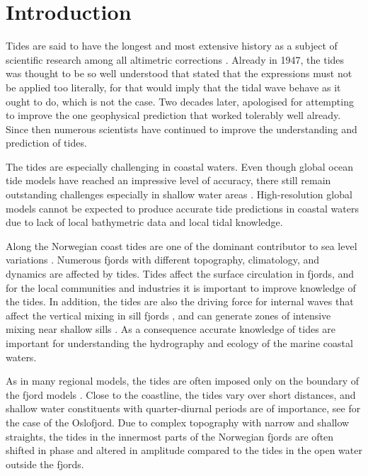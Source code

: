 \section{Introduction}

Tides are said to have the longest and most extensive history as a subject of scientific research among all altimetric corrections \cite[]{egbert94,cartwright77,hendershott81}. Already in 1947, the tides was thought to be so well understood that \cite{unna47} stated that the expressions must not be applied too literally, for that would imply that the tidal wave behave as it ought to do, which is not the case. Two decades later,  \cite{munk66} apologised for attempting to improve the one geophysical prediction that worked tolerably well already. Since then numerous scientists have continued to improve the understanding and prediction of tides. 

The tides are especially challenging in coastal waters. Even though global ocean tide models have reached an impressive level of accuracy, there still remain outstanding challenges especially in shallow water areas \cite[]{stammer14}. 
High-resolution global models cannot be expected to produce accurate tide predictions in coastal waters due to lack of local bathymetric data and local tidal knowledge. 

Along the Norwegian coast tides are one of the dominant contributor to sea level variations \cite[]{grabbe09}. Numerous fjords with different topography, climatology, and dynamics are affected by tides. Tides affect the surface circulation in fjords, and for the local communities and industries it is important to improve knowledge of the tides. In addition, the tides are also the driving force for internal waves that affect the vertical mixing in sill fjords \cite[]{stigebrandt76}, and can generate zones of intensive mixing near shallow sills \cite[]{staal15}. As a consequence accurate knowledge of tides are important for understanding the hydrography and ecology of the marine coastal waters.

As in many regional models, the tides are often imposed only on the boundary of the fjord models \cite[]{gjevik89,carniello05,lynge13}. Close to the coastline, the tides vary over short distances, and shallow water constituents with quarter-diurnal periods are of importance, see \cite{trygg74} for the case of the Oslofjord. Due to complex topography with narrow and shallow straights, 
the tides in the innermost parts of the Norwegian fjords are often shifted in phase and altered in amplitude compared to the tides in the open water outside the fjords. 


